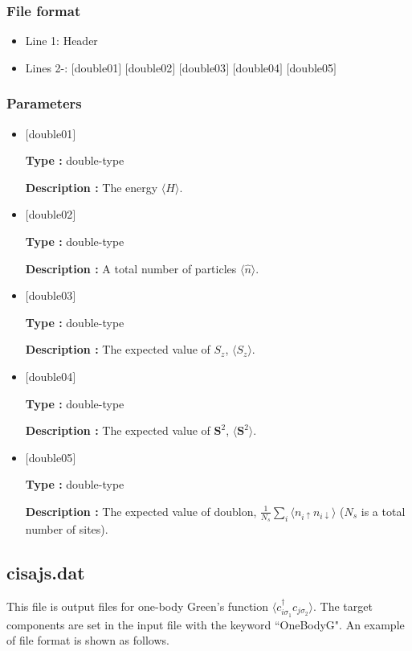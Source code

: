 \subsubsection{File format}
 \begin{itemize}
   \item Line 1: Header
   \item Lines 2-: $[$double01$]$ $[$double02$]$ $[$double03$]$ $[$double04$]$ $[$double05$]$
  \end{itemize}
\subsubsection{Parameters}
 \begin{itemize}

  \item  $[$double01$]$
  
 {\bf Type :} double-type

{\bf Description :} The energy $\langle H\rangle$. 
 
  \item $[$double02$]$

 {\bf Type :} double-type 

{\bf Description :}  A total number of particles $\langle \hat{n}\rangle$.

  \item $[$double03$]$

 {\bf Type :} double-type 

{\bf Description :}  The expected value of $S_z$, $\langle S_z\rangle$. 

  \item $[$double04$]$

 {\bf Type :} double-type 

{\bf Description :}  The expected value of ${\bm S^2}$, $\langle {\bm S^2}\rangle$. 

  \item $[$double05$]$

 {\bf Type :} double-type 

{\bf Description :}  The expected value of doublon, 
$\frac{1}{N_s} \sum_{i}\langle n_{i\uparrow}n_{i\downarrow}\rangle$ ($N_{s}$ is a total number of sites).


 \end{itemize}

\newpage
\subsection{cisajs.dat}
\label{Subsec:cgcisajs}
This file is output files for one-body Green's function $\langle c_{i\sigma_1}^{\dagger}c_{j\sigma_2}\rangle$. 
The target components are set in the input file with the keyword ``OneBodyG".
An example of file format is shown as follows.

